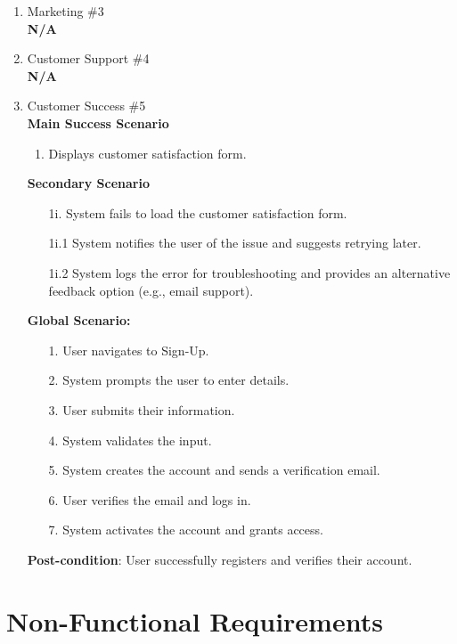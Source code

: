 \documentclass[]{article}
\begin{document}
\begin{enumerate}[{\bf BE1.}]
\begin{enumerate}[{\bf VP1.}]
 \item Marketing \#3 \\
	\textbf{N/A}

\item Customer Support \#4 \\
	\textbf{N/A}  

\item Customer Success \#5 \\
    \textbf{Main Success Scenario}
    \begin{enumerate}
		\item Displays customer satisfaction form.
    \end{enumerate}
    \textbf{Secondary Scenario}
   \begin{enumerate}
		\item[1i.] System fails to load the customer satisfaction form.
            \item[1i.1] System notifies the user of the issue and suggests retrying later.
            \item[1i.2] System logs the error for troubleshooting and provides an alternative feedback option (e.g., email support).
    \end{enumerate} 
	\textbf{Global Scenario:}

	\begin{enumerate}
		\item[1.] User navigates to Sign-Up.
		\item[2.] System prompts the user to enter details.
		\item[3.] User submits their information.
		\item[4.] System validates the input.
		\item[5.] System creates the account and sends a verification email.
		\item[6.] User verifies the email and logs in.
		\item[7.] System activates the account and grants access.
	\end{enumerate}

	\textbf{Post-condition}:  User successfully registers and verifies their account.



\end{enumerate}

\end{enumerate}

\section{Non-Functional Requirements}
\label{sec:non-functional_requirements}
\end{document}
